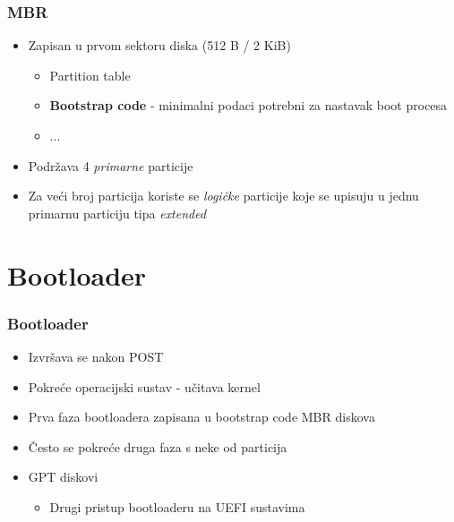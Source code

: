 \documentclass[t]{beamer}
\begin{document}
\begin{frame}
	\frametitle{MBR}
	\begin{itemize}
		\item Zapisan u prvom sektoru diska (512 B / 2 KiB)
		\begin{itemize}
			\item Partition table
			\item \textbf{Bootstrap code} - minimalni podaci potrebni za nastavak boot procesa
			\item ...
		\end{itemize}
		\item Podržava 4 \emph{primarne} particije
		\item Za veći broj particija koriste se \emph{logičke} particije koje se upisuju u jednu primarnu particiju tipa \emph{extended}
	\end{itemize}
\end{frame}

\section{Bootloader}
\begin{frame}
	\frametitle{Bootloader}
	\begin{itemize}
		\item Izvršava se nakon POST
		\item Pokreće operacijski sustav - učitava kernel
	\end{itemize}
	
	\begin{itemize}
		\item Prva faza bootloadera zapisana u bootstrap code MBR diskova
		\item Često se pokreće druga faza s neke od particija
	\end{itemize}
	\begin{itemize}
		\item GPT diskovi
		\begin{itemize}
	 		\item Drugi pristup bootloaderu na UEFI sustavima
		\end{itemize}
	\end{itemize}
\end{frame}
\end{document}
